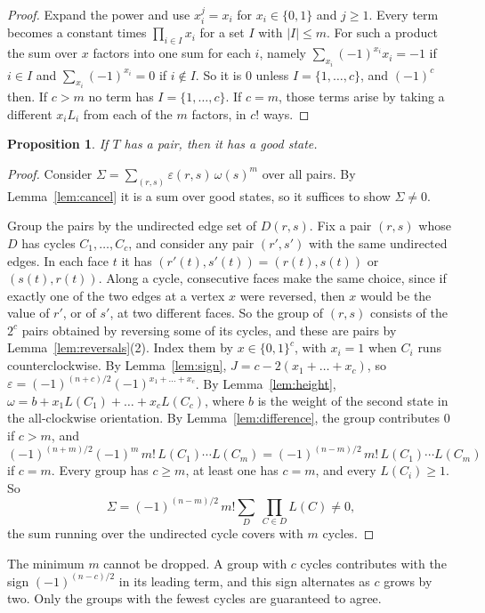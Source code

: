\documentclass[10pt]{amsart}
\numberwithin{equation}{section}
\newtheorem{proposition}[equation]{Proposition}
\theoremstyle{definition}
\theoremstyle{remark}
\newcommand{\T}{T}
\newcommand{\eps}{\varepsilon}
\newcommand{\Dc}{D}
\begin{document}
\begin{proof}
Expand the power and use $x_i^j=x_i$ for $x_i\in\{0,1\}$ and $j\ge1$.
Every term becomes a constant times $\prod_{i\in I}x_i$ for a set $I$ with $|I|\le m$.
For such a product the sum over $x$ factors into one sum for each $i$, namely $\sum_{x_i}(-1)^{x_i}x_i=-1$ if $i\in I$ and $\sum_{x_i}(-1)^{x_i}=0$ if $i\notin I$.
So it is $0$ unless $I=\{1,\dots,c\}$, and $(-1)^c$ then.
If $c>m$ no term has $I=\{1,\dots,c\}$.
If $c=m$, those terms arise by taking a different $x_iL_i$ from each of the $m$ factors, in $c!$ ways.
\end{proof}

\begin{proposition}\label{prop:good}
If $\T$ has a pair, then it has a good state.
\end{proposition}

\begin{proof}
Consider $\Sigma=\sum_{(r,s)}\eps(r,s)\,\omega(s)^m$ over all pairs.
By Lemma~\ref{lem:cancel} it is a sum over good states, so it suffices to show $\Sigma\neq0$.

Group the pairs by the undirected edge set of $\Dc(r,s)$.
Fix a pair $(r,s)$ whose $\Dc$ has cycles $C_1,\dots,C_c$, and consider any pair $(r',s')$ with the same undirected edges.
In each face $t$ it has $(r'(t),s'(t))=(r(t),s(t))$ or $(s(t),r(t))$.
Along a cycle, consecutive faces make the same choice, since if exactly one of the two edges at a vertex $x$ were reversed, then $x$ would be the value of $r'$, or of $s'$, at two different faces.
So the group of $(r,s)$ consists of the $2^c$ pairs obtained by reversing some of its cycles, and these are pairs by Lemma~\ref{lem:reversals}(2).
Index them by $x\in\{0,1\}^c$, with $x_i=1$ when $C_i$ runs counterclockwise.
By Lemma~\ref{lem:sign}, $J=c-2(x_1+\dots+x_c)$, so $\eps=(-1)^{(n+c)/2}(-1)^{x_1+\dots+x_c}$.
By Lemma~\ref{lem:height}, $\omega=b+x_1L(C_1)+\dots+x_cL(C_c)$, where $b$ is the weight of the second state in the all-clockwise orientation.
By Lemma~\ref{lem:difference}, the group contributes $0$ if $c>m$, and
\[
(-1)^{(n+m)/2}(-1)^m\,m!\,L(C_1)\cdots L(C_m)=(-1)^{(n-m)/2}\,m!\,L(C_1)\cdots L(C_m)
\]
if $c=m$.
Every group has $c\ge m$, at least one has $c=m$, and every $L(C_i)\ge1$.
So
\[
\Sigma=(-1)^{(n-m)/2}\,m!\sum_{\Dc}\ \prod_{C\in\Dc}L(C)\neq0,
\]
the sum running over the undirected cycle covers with $m$ cycles.
\end{proof}

The minimum $m$ cannot be dropped. A group with $c$ cycles contributes with the sign $(-1)^{(n-c)/2}$ in its leading term, and this sign alternates as $c$ grows by two.
Only the groups with the fewest cycles are guaranteed to agree.
\end{document}
